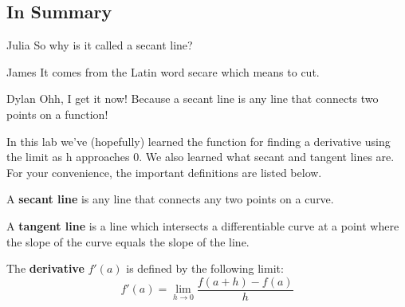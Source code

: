 \documentclass{ximera}
\begin{document}
\subsection{In Summary}
\begin{dialogue}
\item[Julia] So why is it called a secant line?
\item[James] It comes from the Latin word secare which means to cut.
\item[Dylan] Ohh, I get it now! Because a secant line is any line that connects two points on a function!
\end{dialogue}
In this lab we've (hopefully) learned the function for finding a derivative using the limit as h approaches 0. We also learned what secant and tangent lines are. For your convenience, the important definitions are listed below. 
\begin{definition}
 A \textbf{secant line} is any line that connects any two points on a curve.
\end{definition}
\begin{definition}
A \textbf{tangent line} is a line which intersects a differentiable curve at a point where the slope of the curve equals the slope of the line.
\end{definition}
\begin{definition}
The \textbf{derivative} $f'(a)$ is defined by the following limit:
$$f'(a)=\displaystyle \lim_{h\rightarrow 0} \frac{f(a+h)-f(a)}{h}$$
\end{definition}
\end{document}
